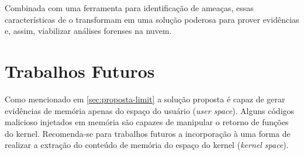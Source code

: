 %
Combinada com uma ferramenta para identificação de ameaças, essas características de \fancyname o transformam em uma solução poderosa para prover evidências e, assim, viabilizar análises forenses na nuvem.

\section{Trabalhos Futuros}
\label{sec: proposta-trab-fut}

%
Como mencionado em \ref{sec:proposta-limit} a solução proposta é capaz de gerar evidências de memória apenas do espaço do usuário (\textit{user space}). 
%
Alguns códigos malicioso injetados em memória são capazes de manipular o retorno de funções do kernel. Recomenda-se para trabalhos futuros a incorporação à \fancyname uma forma de realizar a extração do conteúdo de memória do espaço do kernel (\textit{kernel space}).